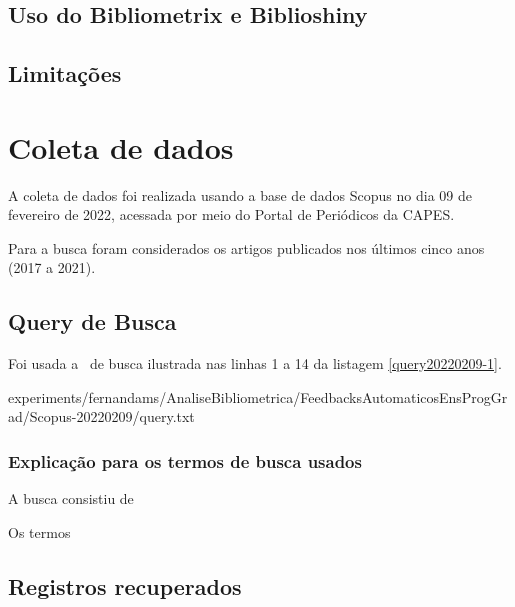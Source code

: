 
\subsection{Uso do Bibliometrix e Biblioshiny}

\subsection{Limitações}

\section{Coleta de dados \label{FeedAuto:coleta}}

A coleta de dados foi realizada usando a base de dados Scopus no dia 09 de fevereiro de 2022, acessada por meio do Portal de Periódicos da CAPES.

Para a busca foram considerados os artigos publicados nos últimos cinco anos (2017 a 2021).

\subsection{Query de Busca}

Foi usada a \query\  de busca ilustrada nas linhas 1 a 14 da listagem \ref{query20220209-1}.


{experiments/fernandams/AnaliseBibliometrica/FeedbacksAutomaticosEnsProgGrad/Scopus-20220209/query.txt}

\subsubsection{Explicação para os termos de busca usados\label{FeedAuto:query}}

A busca consistiu de 

Os termos

\subsection{Registros recuperados}

